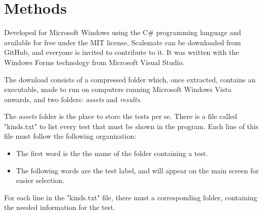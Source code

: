 \documentclass[12pt, a4paper, twoside]{article}
\begin{document}
\section{Methods}


Developed for Microsoft Windows using the C\# programming language and available for free under the MIT license, Scalemate can be downloaded from GitHub, and everyone is invited to contribute to it. It was written with the Windows Forms technology from Microsoft Visual Studio.

The download consists of a compressed folder which, once extracted, contains an executable, made to run on computers running Microsoft Windows Vista onwards, and two folders: \textit{assets} and \textit{results}.

The \textit{assets} folder is the place to store the tests per se. There is a file called "kinds.txt" to list every test that must be shown in the program. Each line of this file must follow the following organization:
\begin{itemize}
\item The first word is the the name of the folder containing a test.
\item The following words are the test label, and will appear on the main screen for easier selection.
\end{itemize}
For each line in the "kinds.txt" file, there must a corresponding folder, containing the needed information for the test.
\end{document}
